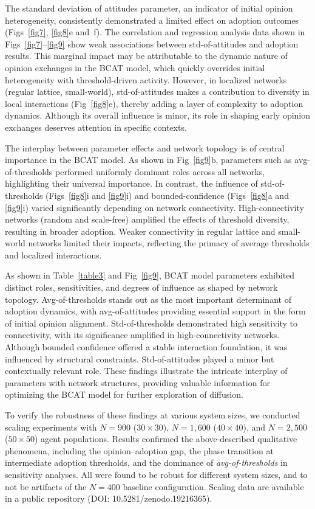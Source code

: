 \documentclass[10pt,letterpaper]{article}
\begin{document}
The standard deviation of attitudes parameter, an indicator of initial opinion heterogeneity, consistently demonstrated a limited effect on adoption outcomes (Figs~\ref{fig7}, \ref{fig8}e and~f). The correlation and regression analysis data shown in Figs~\ref{fig7}--\ref{fig9} show weak associations between std-of-attitudes and adoption results. This marginal impact may be attributable to the dynamic nature of opinion exchanges in the BCAT model, which quickly overrides initial heterogeneity with threshold-driven activity. However, in localized networks (regular lattice, small-world), std-of-attitudes makes a contribution to diversity in local interactions (Fig~\ref{fig8}e), thereby adding a layer of complexity to adoption dynamics. Although its overall influence is minor, its role in shaping early opinion exchanges deserves attention in specific contexts.

The interplay between parameter effects and network topology is of central importance in the BCAT model. As shown in Fig~\ref{fig9}b, parameters such as avg-of-thresholds performed uniformly dominant roles across all networks, highlighting their universal importance. In contrast, the influence of std-of-thresholds (Figs~\ref{fig8}i and \ref{fig9}i) and bounded-confidence (Figs~\ref{fig8}a and \ref{fig9}i) varied significantly depending on network connectivity. High-connectivity networks (random and scale-free) amplified the effects of threshold diversity, resulting in broader adoption. Weaker connectivity in regular lattice and small-world networks limited their impacts, reflecting the primacy of average thresholds and localized interactions.

As shown in Table~\ref{table3} and Fig~\ref{fig9}, BCAT model parameters exhibited distinct roles, sensitivities, and degrees of influence as shaped by network topology. Avg-of-thresholds stands out as the most important determinant of adoption dynamics, with avg-of-attitudes providing essential support in the form of initial opinion alignment. Std-of-thresholds demonstrated high sensitivity to connectivity, with its significance amplified in high-connectivity networks. Although bounded confidence offered a stable interaction foundation, it was influenced by structural constraints. Std-of-attitudes played a minor but contextually relevant role. These findings illustrate the intricate interplay of parameters with network structures, providing valuable information for optimizing the BCAT model for further exploration of diffusion.

To verify the robustness of these findings at various system sizes, we conducted scaling experiments with $N = 900$ ($30 \times 30$), $N = 1{,}600$ ($40 \times 40$), and $N = 2{,}500$ ($50 \times 50$) agent populations. Results confirmed the above-described qualitative phenomena, including the opinion--adoption gap, the phase transition at intermediate adoption thresholds, and the dominance of \textit{avg-of-thresholds} in sensitivity analyses. All were found to be robust for different system sizes, and to not be artifacts of the $N = 400$ baseline configuration. Scaling data are available in a public repository (DOI: 10.5281/zenodo.19216365).
\end{document}
